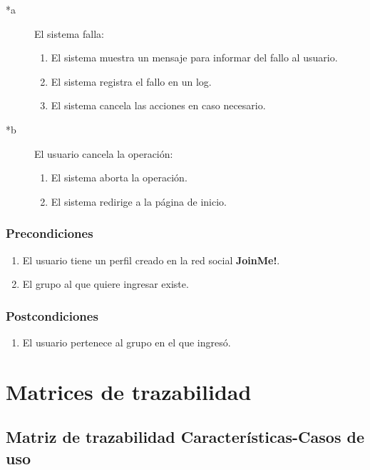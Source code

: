 \documentclass[12pt, a4paper, titlepage]{article}
\begin{document}
	\begin{description}
		\item [*a] El sistema falla:
			\begin{enumerate}
				\item El sistema muestra un mensaje para informar del fallo al usuario.
				\item El sistema registra el fallo en un log.
				\item El sistema cancela las acciones en caso necesario.
			\end{enumerate}
	\end{description}

	\begin{description}
		\item [*b] El usuario cancela la operación:
			\begin{enumerate}
				\item El sistema aborta la operación.
				\item El sistema redirige a la página de inicio.
			\end{enumerate}
	\end{description}
	
\subsubsection{Precondiciones}
	\begin{enumerate}
		\item El usuario tiene un perfil creado en la red social \textbf{JoinMe!}.
		\item El grupo al que quiere ingresar existe.
	\end{enumerate}
\subsubsection{Postcondiciones}
	\begin{enumerate}
		\item El usuario pertenece al grupo en el que ingresó.
	\end{enumerate}

\section{Matrices de trazabilidad}  
\subsection{\large Matriz de trazabilidad Características-Casos de uso}
\end{document}

